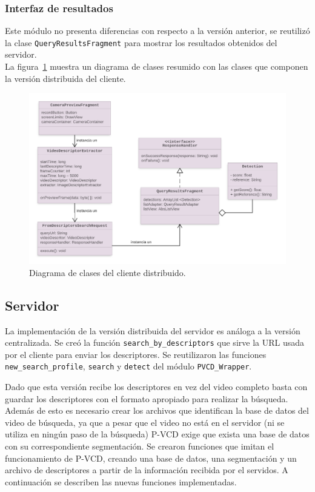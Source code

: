 \subsubsection*{Interfaz de resultados}
Este módulo no presenta diferencias con respecto a la versión anterior, se reutilizó la clase \texttt{QueryResultsFragment} para mostrar los resultados obtenidos del servidor.\\

La figura~\ref{diagrama_cliente_distribuido} muestra un diagrama de clases resumido con las clases que componen la versión distribuida del cliente.
	\begin{figure}[!h]
		\centering
		\includegraphics[scale=1.6]{imagenes/cap4/diagrama_cliente_distribuido.png}
		\caption{Diagrama de clases del cliente distribuido.}
		\label{diagrama_cliente_distribuido}
	\end{figure}

\subsection{Servidor}

La implementación de la versión distribuida del servidor es análoga a la versión centralizada. Se creó la función \texttt{search\_by\_descriptors} que sirve la URL usada por el cliente para enviar los descriptores. Se reutilizaron las funciones \texttt{new\_search\_profile}, \texttt{search} y \texttt{detect} del módulo \texttt{PVCD\_Wrapper}. 

Dado que esta versión recibe los descriptores en vez del video completo basta con guardar los descriptores con el formato apropiado para realizar la búsqueda. Además de esto es necesario crear los archivos que identifican la base de datos del video de búsqueda, ya que a pesar que el video no está en el servidor (ni se utiliza en ningún paso de la búsqueda) P-VCD exige que exista una base de datos con su correspondiente segmentación. Se crearon funciones que imitan el funcionamiento de P-VCD, creando una base de datos, una segmentación y un archivo de descriptores a partir de la información recibida por el servidos. A continuación se describen las nuevas funciones implementadas.

